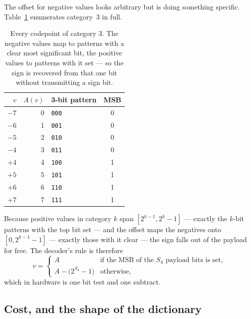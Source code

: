 The offset for negative values looks arbitrary but is doing something specific.
Table~\ref{tab:cat3} enumerates category~3 in full.

\begin{table}[h]
\centering
\caption[Category 3 enumerated]{Every codepoint of category 3. The negative
values map to patterns with a clear most significant bit, the positive values
to patterns with it set --- so the sign is recovered from that one bit without
transmitting a sign bit.}
\label{tab:cat3}
\small
\begin{tabular}{@{}rrlc@{}}
\toprule
$v$ & $A(v)$ & 3-bit pattern & MSB \\
\midrule
$-7$ & 0 & \texttt{000} & 0\\
$-6$ & 1 & \texttt{001} & 0\\
$-5$ & 2 & \texttt{010} & 0\\
$-4$ & 3 & \texttt{011} & 0\\
$+4$ & 4 & \texttt{100} & 1\\
$+5$ & 5 & \texttt{101} & 1\\
$+6$ & 6 & \texttt{110} & 1\\
$+7$ & 7 & \texttt{111} & 1\\
\bottomrule
\end{tabular}
\end{table}

Because positive values in category $k$ span $[2^{k-1}, 2^k - 1]$ --- exactly
the $k$-bit patterns with the top bit set --- and the offset maps the negatives
onto $[0, 2^{k-1} - 1]$ --- exactly those with it clear --- the sign falls out
of the payload for free. The decoder's rule is therefore
\begin{equation}
v = \begin{cases}
A & \text{if the MSB of the $S_4$ payload bits is set},\\
A - \bigl(2^{S_4} - 1\bigr) & \text{otherwise},
\end{cases}
\end{equation}
which in hardware is one bit test and one subtract.

\subsection{Cost, and the shape of the dictionary}
\label{sec:huffman}

